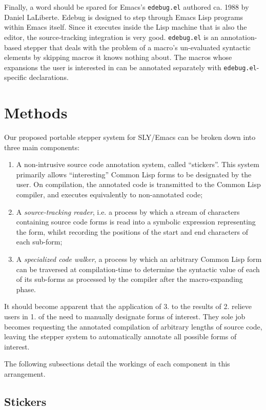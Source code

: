 \documentclass[sigconf]{acmart}
\begin{document}
Finally, a word should be spared for Emacs's \texttt{edebug.el}
authored ca. 1988 by Daniel LaLiberte\cite{edebug}.  Edebug is
designed to step through Emacs Lisp programs within Emacs itself.
Since it executes inside the Lisp machine that is also the editor, the
source-tracking integration is very good.  \texttt{edebug.el} is an
annotation-based stepper that deals with the problem of a macro's
un-evaluated syntactic elements by skipping macros it knows nothing
about.  The macros whose expansions the user is interested in can be
annotated separately with \texttt{edebug.el}-specific declarations.

\section{Methods}

Our proposed portable stepper system for SLY/Emacs can be
broken down into three main components:

\begin{enumerate}
\item A non-intrusive source code annotation system, called
  ``stickers''. This system primarily allows ``interesting'' Common
  Lisp forms to be designated by the user.  On compilation, the
  annotated code is transmitted to the Common Lisp compiler, and
  executes equivalently to non-annotated code;
\item A \emph{source-tracking reader}, i.e. a process by which a
  stream of characters containing source code forms is read into a
  symbolic expression representing the form, whilst recording the
  positions of the start and end characters of each sub-form;
\item A \emph{specialized code walker}, a process by which an
  arbitrary Common Lisp form can be traversed at compilation-time to
  determine the syntactic value of each of its sub-forms as processed
  by the compiler after the macro-expanding phase.
\end{enumerate}

It should become apparent that the application of 3. to the results of
2. relieve users in 1. of the need to manually designate forms of
interest.  They sole job becomes requesting the annotated compilation
of arbitrary lengths of source code, leaving the stepper system to
automatically annotate all possible forms of interest.

The following subsections detail the workings of each component in
this arrangement.

\subsection{Stickers}\label{stickers}
\end{document}
